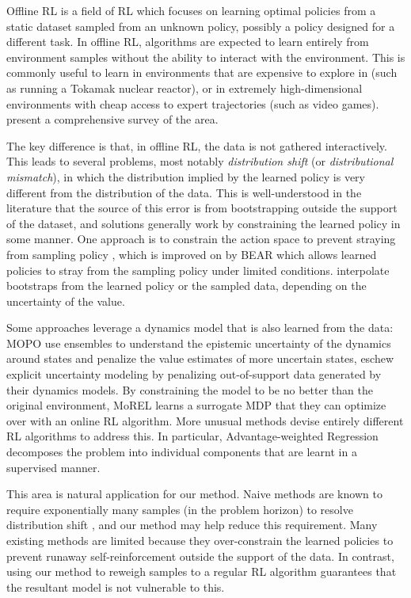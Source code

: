 \documentclass[11pt]{article}
\begin{document}
Offline RL is a field of RL which focuses on learning optimal policies from a static dataset sampled from an unknown policy, possibly a policy designed for a different task. In offline RL, algorithms are expected to learn entirely from environment samples without the ability to interact with the environment. This is commonly useful to learn in environments that are expensive to explore in (such as running a Tokamak nuclear reactor), or in extremely high-dimensional environments with cheap access to expert trajectories (such as video games). \citet{levine2020survey} present a comprehensive survey of the area.

The key difference is that, in offline RL, the data is not gathered interactively. This leads to several problems, most notably \emph{distribution shift} (or \emph{distributional mismatch}), in which the distribution implied by the learned policy is very different from the distribution of the data. This is well-understood in the literature that the source of this error is from bootstrapping outside the support of the dataset, and solutions generally work by constraining the learned policy in some manner. One approach is to constrain the action space to prevent straying from sampling policy \cite{fujimoto2019off}, which is improved on by BEAR \cite{kumar2019stabilizing} which allows learned policies to stray from the sampling policy under limited conditions. \citet{laroche2019safe} interpolate bootstraps from the learned policy or the sampled data, depending on the uncertainty of the value.

Some approaches leverage a dynamics model that is also learned from the data: MOPO \cite{yu2020mopo} use ensembles to understand the epistemic uncertainty of the dynamics around states and penalize the value estimates of more uncertain states, \cite{tianhe2021combo} eschew explicit uncertainty modeling by penalizing out-of-support data generated by their dynamics models. By constraining the model to be no better than the original environment, MoREL \cite{kidambi2020morel} learns a surrogate MDP that they can optimize over with an online RL algorithm. More unusual methods devise entirely different RL algorithms to address this. In particular, Advantage-weighted Regression \cite{peng2019advantage} decomposes the problem into individual components that are learnt in a supervised manner.

This area is natural application for our method. Naive methods are known to require exponentially many samples (in the problem horizon) to resolve distribution shift \cite{wang2020statistical}, and our method may help reduce this requirement. Many existing methods are limited because they over-constrain the learned policies to prevent runaway self-reinforcement outside the support of the data. In contrast, using our method to reweigh samples to a regular RL algorithm guarantees that the resultant model is not vulnerable to this.
\end{document}
